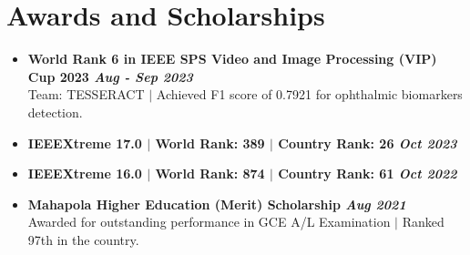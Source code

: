 \documentclass[letterpaper,11pt]{article}
\makeatletter
\newcommand{\resumeItem}[1]{
  \item\small{
    {#1 \vspace{-2pt}}
  }
}
\newcommand{\resumeSubheading}[4]{
  \vspace{-2pt}\item
    \begin{tabular*}{0.97\textwidth}[t]{l@{\extracolsep{\fill}}r}
      \textbf{#1} & #2 \\
      \textit{\small#3} & \textit{\small #4} \\
    \end{tabular*}\vspace{-7pt}
}
\newcommand{\resumeSubHeadingListStart}{\begin{itemize}[leftmargin=0.15in, label={}]}
\newcommand{\resumeSubHeadingListEnd}{\end{itemize}}
\newcommand{\resumeItemListStart}{\begin{itemize}}
\newcommand{\resumeItemListEnd}{\end{itemize}\vspace{-5pt}}
\makeatother
\begin{document}

\section{Awards and Scholarships}
\begin{itemize}[leftmargin=0pt, label={}]
    \item \textbf{\small{World Rank 6 in IEEE SPS Video and Image Processing (VIP) Cup 2023} \hfill \textit{Aug - Sep 2023}} \\
    \small{Team: TESSERACT $|$ Achieved F1 score of 0.7921 for ophthalmic biomarkers detection.}

    \item \textbf{\small{IEEEXtreme 17.0} $|$ \small{\textbf{World Rank: 389} $|$ \textbf{Country Rank: 26}} \hfill \textit{Oct 2023}} \\
    
    \item \textbf{\small{IEEEXtreme 16.0} $|$ \small{\textbf{World Rank: 874} $|$ \textbf{Country Rank: 61}} \hfill \textit{Oct 2022}} \\

    \item \textbf{\small{Mahapola Higher Education (Merit) Scholarship} \hfill \textit{Aug 2021}} \\
    \small{Awarded for outstanding performance in GCE A/L Examination $|$ Ranked 97th in the country.}

\end{itemize}
\end{document}
